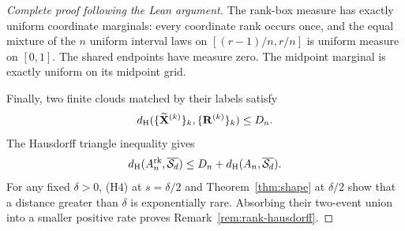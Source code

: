 \begin{proof}[Complete proof following the Lean argument]
The rank-box measure has exactly uniform coordinate marginals: every
coordinate rank occurs once, and the equal mixture of the $n$ uniform
interval laws on $[(r-1)/n,r/n]$ is uniform measure on $[0,1]$.
The shared endpoints have measure zero. The midpoint marginal is exactly
uniform on its midpoint grid.

Finally, two finite clouds matched by their labels satisfy
\[
 d_{\rm H}(\{\widetilde{\mathbf X}^{(k)}\}_k,
                    \{\mathbf R^{(k)}\}_k)\le D_n.
\]
The Hausdorff triangle inequality gives
\[
 d_{\rm H}(A_n^{\mathrm{rk}},\overline{\mathcal S_d})
             \le D_n+d_{\rm H}(A_n,\overline{\mathcal S_d}).
\]
For any fixed $\delta>0$, (H4) at $s=\delta/2$ and
Theorem~\ref{thm:shape} at $\delta/2$ show that a distance greater than
$\delta$ is exponentially rare. Absorbing their two-event union into a
smaller positive rate proves Remark~\ref{rem:rank-hausdorff}.
\end{proof}
